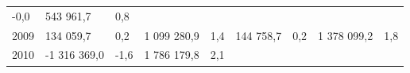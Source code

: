 \begin{longtable}[]{@{}lllllllll@{}}
\begin{minipage}[t]{0.06\columnwidth}
-0,0\strut
\end{minipage} & \begin{minipage}[t]{0.10\columnwidth}\raggedright
543 961,7\strut
\end{minipage} & \begin{minipage}[t]{0.06\columnwidth}\raggedright
0,8\strut
\end{minipage}\tabularnewline
\begin{minipage}[t]{0.05\columnwidth}\raggedright
2009\strut
\end{minipage} & \begin{minipage}[t]{0.10\columnwidth}\raggedright
134 059,7\strut
\end{minipage} & \begin{minipage}[t]{0.06\columnwidth}\raggedright
0,2\strut
\end{minipage} & \begin{minipage}[t]{0.16\columnwidth}\raggedright
1 099 280,9\strut
\end{minipage} & \begin{minipage}[t]{0.06\columnwidth}\raggedright
1,4\strut
\end{minipage} & \begin{minipage}[t]{0.12\columnwidth}\raggedright
144 758,7\strut
\end{minipage} & \begin{minipage}[t]{0.06\columnwidth}\raggedright
0,2\strut
\end{minipage} & \begin{minipage}[t]{0.10\columnwidth}\raggedright
1 378 099,2\strut
\end{minipage} & \begin{minipage}[t]{0.06\columnwidth}\raggedright
1,8\strut
\end{minipage}\tabularnewline
\begin{minipage}[t]{0.05\columnwidth}\raggedright
2010\strut
\end{minipage} & \begin{minipage}[t]{0.10\columnwidth}\raggedright
-1 316 369,0\strut
\end{minipage} & \begin{minipage}[t]{0.06\columnwidth}\raggedright
-1,6\strut
\end{minipage} & \begin{minipage}[t]{0.16\columnwidth}\raggedright
1 786 179,8\strut
\end{minipage} & \begin{minipage}[t]{0.06\columnwidth}\raggedright
2,1\strut

\end{minipage}
\end{longtable}

